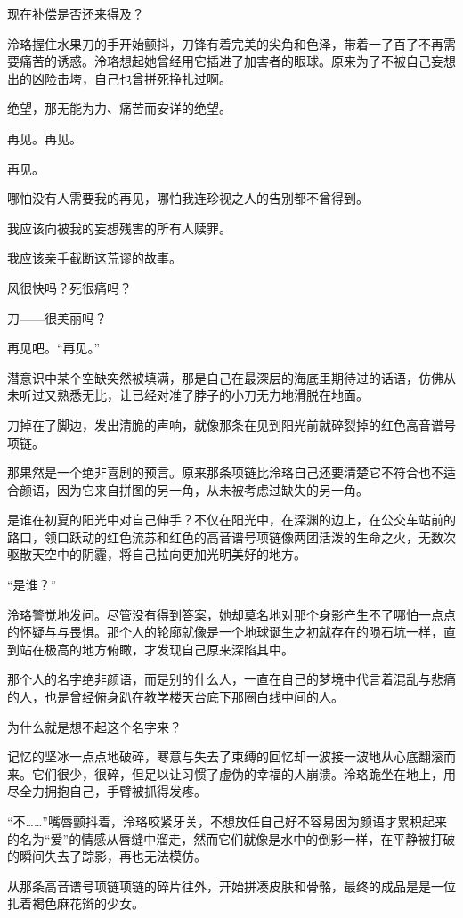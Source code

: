 \documentclass[UTF8, scheme = chinese, openany]{ctexbook}
\begin{document}
现在补偿是否还来得及？

泠珞握住水果刀的手开始颤抖，刀锋有着完美的尖角和色泽，带着一了百了不再需要痛苦的诱惑。泠珞想起她曾经用它插进了加害者的眼球。原来为了不被自己妄想出的凶险击垮，自己也曾拼死挣扎过啊。

绝望，那无能为力、痛苦而安详的绝望。

再见。再见。

再见。

哪怕没有人需要我的再见，哪怕我连珍视之人的告别都不曾得到。

我应该向被我的妄想残害的所有人赎罪。

我应该亲手截断这荒谬的故事。

风很快吗？死很痛吗？

刀——很美丽吗？

再见吧。“再见。”

潜意识中某个空缺突然被填满，那是自己在最深层的海底里期待过的话语，仿佛从未听过又熟悉无比，让已经对准了脖子的小刀无力地滑脱在地面。

刀掉在了脚边，发出清脆的声响，就像那条在见到阳光前就碎裂掉的红色高音谱号项链。

那果然是一个绝非喜剧的预言。原来那条项链比泠珞自己还要清楚它不符合也不适合颜语，因为它来自拼图的另一角，从未被考虑过缺失的另一角。

是谁在初夏的阳光中对自己伸手？不仅在阳光中，在深渊的边上，在公交车站前的路口，领口跃动的红色流苏和红色的高音谱号项链像两团活泼的生命之火，无数次驱散天空中的阴霾，将自己拉向更加光明美好的地方。

“是谁？”

泠珞警觉地发问。尽管没有得到答案，她却莫名地对那个身影产生不了哪怕一点点的怀疑与与畏惧。那个人的轮廓就像是一个地球诞生之初就存在的陨石坑一样，直到站在极高的地方俯瞰，才发现自己原来深陷其中。

那个人的名字绝非颜语，而是别的什么人，一直在自己的梦境中代言着混乱与悲痛的人，也是曾经俯身趴在教学楼天台底下那圈白线中间的人。

为什么就是想不起这个名字来？

记忆的坚冰一点点地破碎，寒意与失去了束缚的回忆却一波接一波地从心底翻滚而来。它们很少，很碎，但足以让习惯了虚伪的幸福的人崩溃。泠珞跪坐在地上，用尽全力拥抱自己，手臂被抓得发疼。

“不……”嘴唇颤抖着，泠珞咬紧牙关，不想放任自己好不容易因为颜语才累积起来的名为“爱”的情感从唇缝中溜走，然而它们就像是水中的倒影一样，在平静被打破的瞬间失去了踪影，再也无法模仿。

从那条高音谱号项链项链的碎片往外，开始拼凑皮肤和骨骼，最终的成品是是一位扎着褐色麻花辫的少女。
\end{document}
